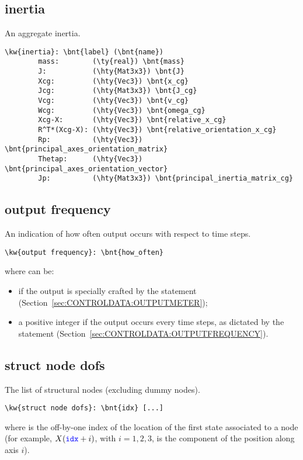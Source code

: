 \subsection{inertia}
An aggregate inertia.
\begin{Verbatim}[commandchars=\\\{\}]
    \kw{inertia}: \bnt{label} (\bnt{name})
        mass:        (\ty{real}) \bnt{mass}
        J:           (\hty{Mat3x3}) \bnt{J}
        Xcg:         (\hty{Vec3}) \bnt{x_cg}
        Jcg:         (\hty{Mat3x3}) \bnt{J_cg}
        Vcg:         (\hty{Vec3}) \bnt{v_cg}
        Wcg:         (\hty{Vec3}) \bnt{omega_cg}
        Xcg-X:       (\hty{Vec3}) \bnt{relative_x_cg}
        R^T*(Xcg-X): (\hty{Vec3}) \bnt{relative_orientation_x_cg}
        Rp:          (\hty{Vec3}) \bnt{principal_axes_orientation_matrix}
        Thetap:      (\hty{Vec3}) \bnt{principal_axes_orientation_vector}
        Jp:          (\hty{Mat3x3}) \bnt{principal_inertia_matrix_cg}
\end{Verbatim}

\subsection{output frequency}
An indication of how often output occurs with respect to time steps.
\begin{Verbatim}[commandchars=\\\{\}]
\kw{output frequency}: \bnt{how_often}
\end{Verbatim}
where  can be:
\begin{itemize}
\item {} if the output is specially crafted by the
 statement (Section~\ref{sec:CONTROLDATA:OUTPUTMETER});
\item a positive integer if the output occurs every 
time steps, as dictated by the  statement
(Section~\ref{sec:CONTROLDATA:OUTPUTFREQUENCY}).
\end{itemize}

\subsection{struct node dofs}
The list of structural nodes (excluding dummy nodes).
\begin{Verbatim}[commandchars=\\\{\}]
\kw{struct node dofs}: \bnt{idx} [...]
\end{Verbatim}
where  is the off-by-one index of the location of the first
state associated to a node (for example, $X(\textcolor{blue}{\texttt{idx}} + i)$, with $i = 1,2,3$,
is the component of the position along axis $i$).


